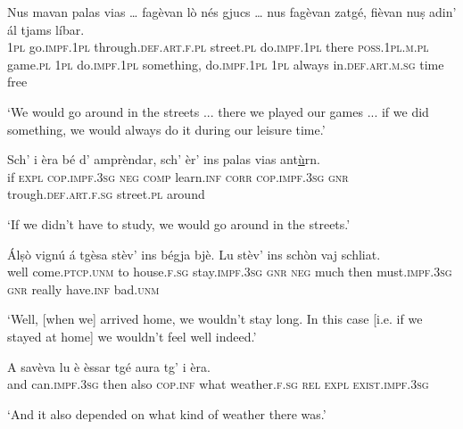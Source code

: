 \begin{linenumbers}
	\gll Nus mavan palas vias … fagèvan lò nés\footnotemark{} gjucs …  nus fagèvan zatgé, fièvan nuṣ adin’ ál tjams líbar.\\
	\textsc{1pl} go.\textsc{impf.1pl} through.\textsc{def.art.f.pl} street.\textsc{pl} {} do.\textsc{impf.1pl} there \textsc{poss.1pl.m.pl} game.\textsc{pl} {} \textsc{1pl} do.\textsc{impf.1pl} something, do.\textsc{impf.1pl} \textsc{1pl} always in.\textsc{def.art.m.sg} time free\\
\end{linenumbers}
\medskip
\glt `We would go around in the streets ... there we played our games ... if we did something, we would always do it during our leisure time.'
\medskip

\begin{linenumbers}
	\gll Sch’ i èra bé d’ amprèndar, sch’ èr’ ins palas vias ant\underline{ù}rn.   \\
	if \textsc{expl} \textsc{cop.impf.3sg} \textsc{neg} \textsc{comp} learn.\textsc{inf} \textsc{corr} \textsc{cop.impf.3sg} \textsc{gnr} trough.\textsc{def.art.f.sg} street.\textsc{pl} around\\
\end{linenumbers}
\medskip
\glt `If we didn't have to study, we would go around in the streets.'
\medskip

\begin{linenumbers}
	\gll  Álṣò vignú á tgèsa stèv’ ins bégja bjè. Lu stèv’ ins schòn vaj schliat.  \\
	well come.\textsc{ptcp.unm} to house.\textsc{f.sg} stay.\textsc{impf.3sg} \textsc{gnr} \textsc{neg} much then must.\textsc{impf.3sg} \textsc{gnr} really have.\textsc{inf} bad.\textsc{unm}\\
\end{linenumbers}
\medskip
\glt `Well, [when we] arrived home, we wouldn't stay long. In this case [i.e. if we stayed at home] we wouldn't feel well indeed.'
\medskip

\begin{linenumbers}
	\gll  A savèva lu è èssar tgé aura tg’ i èra.  \\
	and can.\textsc{impf.3sg} then also \textsc{cop.inf} what weather.\textsc{f.sg} \textsc{rel} \textsc{expl} \textsc{exist.impf.3sg}\\
\end{linenumbers}
\medskip
\glt `And it also depended on what kind of weather there was.'
\medskip

